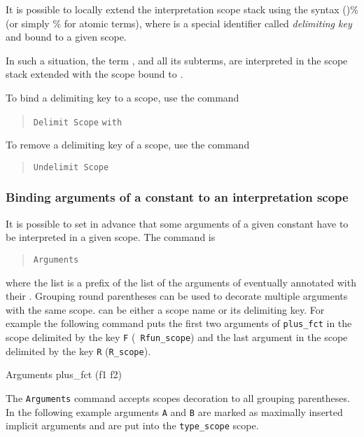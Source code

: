 It is possible to locally extend the interpretation scope stack using
the syntax ({\term})\%{\delimkey} (or simply {\term}\%{\delimkey}
for atomic terms), where {\delimkey} is a special identifier called
{\em delimiting key} and bound to a given scope.

In such a situation, the term {\term}, and all its subterms, are
interpreted in the scope stack extended with the scope bound to
{\delimkey}.

To bind a delimiting key to a scope, use the command

\begin{quote}
\texttt{Delimit Scope} {\scope} \texttt{with} {\ident} 
\end{quote}

To remove a delimiting key of a scope, use the command

\begin{quote}
\texttt{Undelimit Scope} {\scope}
\end{quote}

\subsubsection{Binding arguments of a constant to an interpretation scope
}

It is possible to set in advance that some arguments of a given
constant have to be interpreted in a given scope. The command is
\begin{quote}
{\tt Arguments} {\qualid} \nelist{\name {\tt \%}\scope}{}
\end{quote}
where the list is a prefix of the list of the arguments of {\qualid} eventually
annotated with their {\scope}. Grouping round parentheses can be used to
decorate multiple arguments with the same scope.  {\scope} can be either a scope
name or its delimiting key. For example the following command puts the first two
arguments of {\tt plus\_fct} in the scope delimited by the key {\tt F} ({\tt
  Rfun\_scope}) and the last argument in the scope delimited by the key {\tt R}
({\tt R\_scope}).

\begin{coq_example*}
Arguments plus_fct (f1 f2)%
\end{coq_example*}

The {\tt Arguments} command accepts scopes decoration to all grouping
parentheses. In the following example arguments {\tt A} and {\tt B} 
are marked as maximally inserted implicit arguments and are
put into the {\tt type\_scope} scope.

